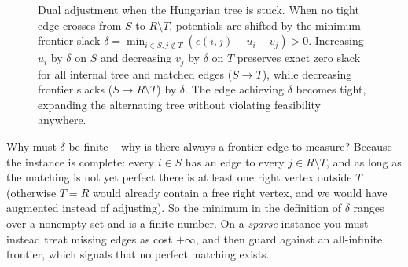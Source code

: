 \begin{figure}[H]
\caption{Dual adjustment when the Hungarian tree is stuck.
When no tight edge crosses from $S$ to $R\setminus T$, potentials are shifted by
the minimum frontier slack $\delta = \min_{i\in S, j\notin T}(c(i,j)-u_i-v_j) > 0$.
Increasing $u_i$ by $\delta$ on $S$ and decreasing $v_j$ by $\delta$ on $T$ preserves
exact zero slack for all internal tree and matched edges ($S \to T$), while decreasing
frontier slacks ($S \to R\setminus T$) by $\delta$. The edge achieving $\delta$ becomes
tight, expanding the alternating tree without violating feasibility anywhere.}
\label{ch16:fig-dual-adjustment}
\end{figure}

\begin{walkbox}
Why must $\delta$ be finite -- why is there always a frontier edge to measure? Because the instance is complete: every $i\in S$ has an edge to every $j\in R\setminus T$, and as long as the matching is not yet perfect there is at least one right vertex outside $T$ (otherwise $T=R$ would already contain a free right vertex, and we would have augmented instead of adjusting). So the minimum in the definition of $\delta$ ranges over a nonempty set and is a finite number. On a \emph{sparse} instance you must instead treat missing edges as cost $+\infty$, and then guard against an all-infinite frontier, which signals that no perfect matching exists.
\end{walkbox}

